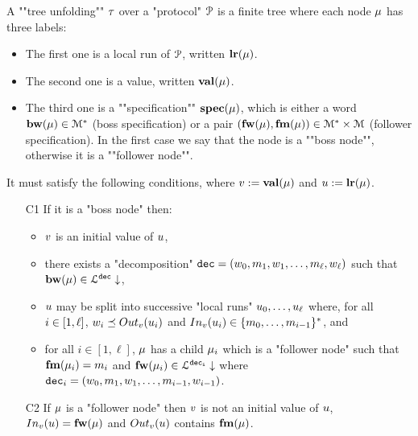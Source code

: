 \begin{definition}
	\label{def:tree-unfolding}
	A ""tree unfolding"" $\tau$ over a "protocol" $\mathcal{P}$ is
	a finite tree where each node $\mu$ has three labels:
	\begin{itemize}
		\item The first one is a local run of $\mathcal{P}$, written $\mathbf{lr}(\mu)$. 
		
		\item The second one is a value, written $\mathbf{val}(\mu)$.
		
		\item The third one is a ""specification"" $\mathbf{spec}(\mu)$, which is either a word $\mathbf{bw}(\mu) \in \mathcal{M}^*$ (boss specification) or a pair $(\mathbf{fw}(\mu), \mathbf{fm}(\mu)) \in \mathcal{M}^* \times \mathcal{M}$ (follower specification). In the first case we say that the node is a ""boss node"", otherwise it is a ""follower node"".
	\end{itemize} 
	
	It must satisfy the following conditions, where $v := \mathbf{val}(\mu)$ and $u := \mathbf{lr}(\mu)$.

	\begin{itemize}
		\item[C1\namedlabel{unfoldingC1}{C1}] If it is a "boss node" then:
		\begin{itemize} 
			\item $v$ is an initial value of $u$, 
			\item there exists a "decomposition" $\mathtt{dec} = (w_0, m_1, w_1, \ldots, m_{\ell}, w_{\ell})$ such that $\mathbf{bw}(\mu) \in \mathcal{L}^{\mathtt{\mathtt{dec}}}\downarrow$, 
			\item $u$ may be split into successive "local runs" $u_0, \dots, u_{\ell}$ where, for all $i \in [1,\ell]$, $w_i \subword \voutput{\aval}{\localrun_i}$ and $\vinput{\aval}{\localrun_i} \in \set{m_0, \dots, m_{i-1}}^*$, and
			\item  for all $i \in [1,\ell]$, $\mu$ has a child $\mu_i$ which is a "follower node" such that $\mathbf{fm}(\mu_i) = m_i$ and $\mathbf{fw}(\mu_i) \in\mathcal{L}^{\mathtt{\mathtt{dec}_i}}\downarrow$ where $\mathtt{dec}_i = (w_0, m_1, w_1, \ldots, m_{i-1}, w_{i-1})$.
		\end{itemize}
		\item[C2\namedlabel{unfoldingC2}{C2}] If $\mu$ is a "follower node" then $v$ is not an initial value of $u$, $\vinput{\aval}{\localrun} = \followlabelword{\node}$ and 
		$\voutput{\aval}{\localrun}$ contains $\mathbf{fm}(\mu)$.
		

\end{itemize}
\end{definition}
